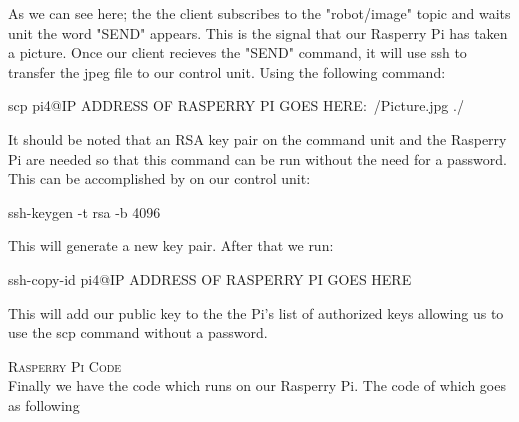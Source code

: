 \documentclass[12pt,a4paper]{article}
\begin{document}
As we can see here; the the client subscribes to the "robot/image" topic and waits unit the word "SEND" appears. This is the signal that our Rasperry Pi has taken a picture.
Once our client recieves the "SEND" command, it will use ssh to transfer the jpeg file to our control unit.
Using the following command:

scp pi4@IP ADDRESS OF RASPERRY PI GOES HERE:~/Picture.jpg ./

It should be noted that an RSA key pair on the command unit and the Rasperry Pi are needed so that this command can be run without the need for a password.
This can be accomplished by  on our control unit:

ssh-keygen -t rsa -b 4096

This will generate a new key pair.
After that we run:

ssh-copy-id pi4@IP ADDRESS OF RASPERRY PI GOES HERE

This will add our public key to the the Pi's list of authorized keys allowing us to use the scp command without a password.

\clearpage

\newpage

\textsc{\LARGE Rasperry Pi Code }\\[1.5cm]

Finally we have the code which runs on our Rasperry Pi.
The code of which goes as following
\end{document}

